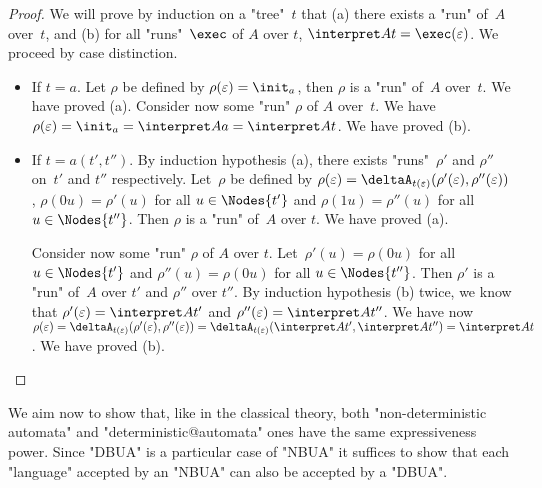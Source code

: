 \documentclass[a4paper,UKenglish,cleveref, autoref, thm-restate]{lipics-v2021}
\begin{document}
\begin{proof}
	We will prove by induction on a "tree"~$t$ that (a) there exists a "run" of~$A$ over~$t$, and (b) for all "runs"~$\exec$ of $A$ over $t$, $\interpret A t = \exec (\varepsilon)$.
	We proceed by case distinction.
	\begin{itemize}
		\item If $t = a$. Let $\rho$ be defined by $\rho(\varepsilon)=\init_a$, then $\rho$ is a "run" of~$A$ over~$t$. We have proved (a).
		      Consider now some "run" $\rho$ of $A$ over~$t$. We have $\rho(\varepsilon)=\init_a=\interpret A a=\interpret A t$. We have proved  (b).

		\item If $t = a(t',t'')$. By induction hypothesis (a), there exists "runs"~$\rho'$ and $\rho''$ on~$t'$ and $t''$ respectively.
		      Let~$\rho$ be defined by $\rho(\varepsilon)=\deltaA_{t(\varepsilon)}(\rho'(\varepsilon),\rho''(\varepsilon))$,
		      $\rho(0u)=\rho'(u)$ for all $u\in\Nodes{t'}$ and $\rho(1u)=\rho''(u)$ for all~$u\in \Nodes{t''}$. Then $\rho$ is a "run" of~$A$ over $t$. We have proved (a).

		      Consider now some "run" $\rho$ of $A$ over $t$. Let~$\rho'(u)=\rho(0u)$ for all $u \in \Nodes {t'}$ and $\rho''(u)=\rho(0u)$ for all $u \in \Nodes {t''}$.
		      Then $\rho'$ is a "run" of~$A$ over $t'$ and $\rho''$ over $t''$. By induction hypothesis (b) twice, we know that $\rho'(\varepsilon)=\interpret A {t'}$ and $\rho''(\varepsilon)=\interpret A {t''}$.
		      We have now $\rho(\varepsilon) = \deltaA_{t(\varepsilon)}(\rho'(\varepsilon),\rho''(\varepsilon)) = \deltaA_{t(\varepsilon)}(\interpret A {t'},\interpret A {t''}) = \interpret A t$. We have proved (b).
	\end{itemize}
\end{proof}


We aim now to show that, like in the classical theory, both "non-deterministic automata" and "deterministic@automata" ones have the same expressiveness power.
Since "DBUA" is a particular case of "NBUA" it suffices to show that each "language" accepted by an "NBUA" can also be accepted by a "DBUA".
\end{document}
